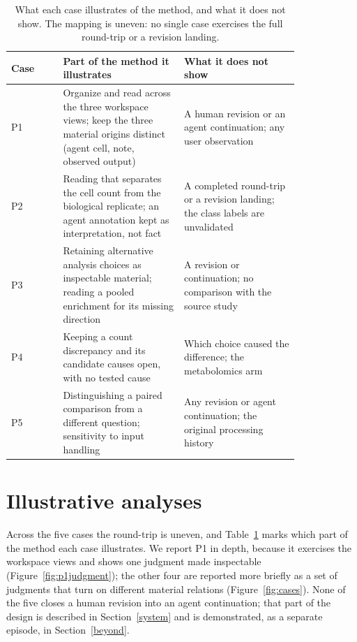 \documentclass[11pt]{article}
\begin{document}
\begin{table}[!htbp]
\centering
\small
\caption{What each case illustrates of the method, and what it does not show. The mapping is uneven: no single case exercises the full round-trip or a revision landing.}
\label{tab:mapping}
\begin{tabular}{@{}l >{\raggedright\arraybackslash}p{0.42\linewidth} >{\raggedright\arraybackslash}p{0.40\linewidth}@{}}
\hline
Case & Part of the method it illustrates & What it does not show \\
\hline
P1 & Organize and read across the three workspace views; keep the three material origins distinct (agent cell, note, observed output) & A human revision or an agent continuation; any user observation \\
P2 & Reading that separates the cell count from the biological replicate; an agent annotation kept as interpretation, not fact & A completed round-trip or a revision landing; the class labels are unvalidated \\
P3 & Retaining alternative analysis choices as inspectable material; reading a pooled enrichment for its missing direction & A revision or continuation; no comparison with the source study \\
P4 & Keeping a count discrepancy and its candidate causes open, with no tested cause & Which choice caused the difference; the metabolomics arm \\
P5 & Distinguishing a paired comparison from a different question; sensitivity to input handling & Any revision or agent continuation; the original processing history \\
\hline
\end{tabular}
\end{table}

\section{Illustrative analyses}\label{episodes}

Across the five cases the round-trip is uneven, and Table~\ref{tab:mapping} marks which part of the method each case illustrates. We report P1 in depth, because it exercises the workspace views and shows one judgment made inspectable (Figure~\ref{fig:p1judgment}); the other four are reported more briefly as a set of judgments that turn on different material relations (Figure~\ref{fig:cases}). None of the five closes a human revision into an agent continuation; that part of the design is described in Section~\ref{system} and is demonstrated, as a separate episode, in Section~\ref{beyond}.
\end{document}
